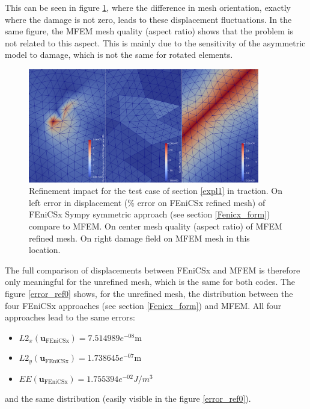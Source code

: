 \documentclass[12pt]{article}
\newcommand{\f}[1]{FEniCSx#1}
\newcommand{\vm}[1]{
	{\ensuremath{\mathbf{#1}}}
}
\begin{document}
This can be seen in figure \ref{diff}, where the difference in mesh orientation, exactly where the damage is not zero, leads to these displacement fluctuations. 
In the same figure, the MFEM mesh quality (aspect ratio) shows that the problem is not related to this aspect. 
This is mainly due to the sensitivity of the asymmetric model to damage, which is not the same for rotated elements. 
\begin{figure}	
	\includegraphics[width=0.9\textwidth]{diff_ref2_vol_zoom_mesh_difference.png}
	\caption{Refinement impact for the test case of section \ref{expl1} in traction. On left error in displacement  (\% error on \f{} refined mesh) of \f{} Sympy symmetric approach (see section \ref{Fenicx_form}) compare to MFEM. On center mesh quality (aspect ratio) of MFEM refined mesh. On right damage field on MFEM mesh in this location.\label{diff}}
\end{figure}
The full comparison of displacements between \f{} and MFEM is therefore only meaningful for the unrefined mesh, which is the same for both codes.
The figure \ref{error_ref0} shows, for the unrefined mesh, the distribution between the four \f{} approaches (see section \ref{Fenicx_form}) and MFEM. 
All four approaches lead to the same errors:
\begin{itemize}
	\item $L2_x(\vm{u}_{\text{\f{}}})=7.514989e^{-08}$m
	\item $L2_y(\vm{u}_{\text{\f{}}})= 1.738645e^{-07}$m
	\item $EE(\vm{u}_{\text{\f{}}})= 1.755394e^{-02}J/m^3$
\end{itemize}
and the same distribution (easily visible in the figure \ref{error_ref0}).
\end{document}
